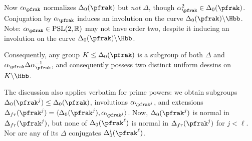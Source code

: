 \documentclass[11pt]{amsart}
\begin{document}
Now $\alpha_\pfrak$ normalizes $\Delta_0(\pfrak)$ but \emph{not} $\Delta$, though $\alpha_\pfrak^2 \in \Delta_0(\pfrak)$. Conjugation by $\alpha_\pfrak$ induces an involution on the curve $\Delta_0(\pfrak)\lmod \Hbb$. Note: $\alpha_\pfrak \in \PSL(2,\R)$ may not have order two, despite it inducing an involution on the curve $\Delta_0(\pfrak) \lmod \Hbb$.

Consequently, any group $K\leq \Delta_0(\pfrak)$ is a subgroup of both $\Delta$ and $\alpha_\pfrak \Delta \alpha_\pfrak^\inv$, and consequently possess two distinct uniform dessins on $K\lmod \Hbb$.

The discussion also applies verbatim for prime powers: we obtain subgroups $\Delta_0(\pfrak^j) \leq \Delta_0(\pfrak)$, involutions $\alpha_{\pfrak^j}$, and extensions $\Delta_{fr}(\pfrak^j)=\langle \Delta_0(\pfrak^j),\alpha_{\pfrak^j}\rangle $. Now, $\Delta_{0}(\pfrak^j)$ is normal in $\Delta_{fr}(\pfrak^j)$, but none of $\Delta_0(\pfrak^\ell)$ is normal in $\Delta_{fr}(\pfrak^j)$ for $j<\ell$. Nor are any of its $\Delta$ conjugates $\Delta_0^i(\pfrak^\ell)$.
\end{document}
